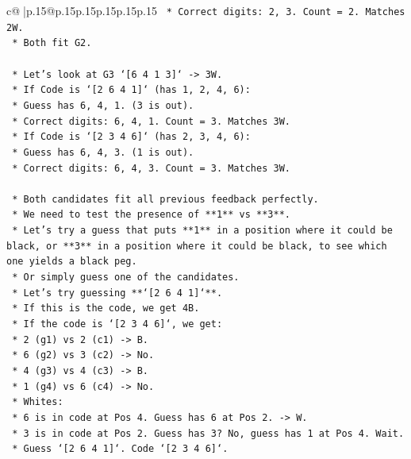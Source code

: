 \documentclass{article}
\begin{document}
{\begin{supertabular}{c@{$\;$}|p{.15\linewidth}@{}p{.15\linewidth}p{.15\linewidth}p{.15\linewidth}p{.15\linewidth}p{.15\linewidth}}
{{{\texttt{                *   Correct digits: 2, 3. Count = 2. Matches 2W.} \\
\texttt{        *   Both fit G2.} \\
\\ 
\texttt{    *   Let's look at G3 `{[}6 4 1 3{]}` {-}> 3W.} \\
\texttt{        *   If Code is `{[}2 6 4 1{]}` (has 1, 2, 4, 6):} \\
\texttt{            *   Guess has 6, 4, 1. (3 is out).} \\
\texttt{            *   Correct digits: 6, 4, 1. Count = 3. Matches 3W.} \\
\texttt{        *   If Code is `{[}2 3 4 6{]}` (has 2, 3, 4, 6):} \\
\texttt{            *   Guess has 6, 4, 3. (1 is out).} \\
\texttt{            *   Correct digits: 6, 4, 3. Count = 3. Matches 3W.} \\
\\ 
\texttt{    *   Both candidates fit all previous feedback perfectly.} \\
\texttt{    *   We need to test the presence of **1** vs **3**.} \\
\texttt{    *   Let's try a guess that puts **1** in a position where it could be black, or **3** in a position where it could be black, to see which one yields a black peg.} \\
\texttt{    *   Or simply guess one of the candidates.} \\
\texttt{    *   Let's try guessing **`{[}2 6 4 1{]}`**.} \\
\texttt{        *   If this is the code, we get 4B.} \\
\texttt{        *   If the code is `{[}2 3 4 6{]}`, we get:} \\
\texttt{            *   2 (g1) vs 2 (c1) {-}> B.} \\
\texttt{            *   6 (g2) vs 3 (c2) {-}> No.} \\
\texttt{            *   4 (g3) vs 4 (c3) {-}> B.} \\
\texttt{            *   1 (g4) vs 6 (c4) {-}> No.} \\
\texttt{            *   Whites:} \\
\texttt{                *   6 is in code at Pos 4. Guess has 6 at Pos 2. {-}> W.} \\
\texttt{                *   3 is in code at Pos 2. Guess has 3? No, guess has 1 at Pos 4. Wait.} \\
\texttt{                *   Guess `{[}2 6 4 1{]}`. Code `{[}2 3 4 6{]}`.} \\
}}}
\end{supertabular}}
\end{document}
